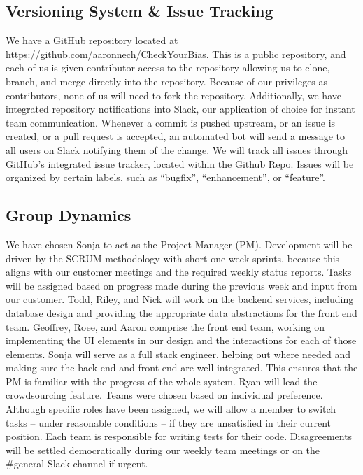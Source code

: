 \documentclass[11pt]{article}
\begin{document}
\subsection{Versioning System \& Issue Tracking}

We have a GitHub repository located at \href{https://github.com/aaronnech/CheckYourBias}{https://github.com/aaronnech/CheckYourBias}. This is a public repository, and each of us is given contributor access to the repository allowing us to clone, branch, and merge directly into the repository. Because of our privileges as contributors, none of us will need to fork the repository. Additionally, we have integrated repository notifications into Slack, our application of choice for instant team communication. Whenever a commit is pushed upstream, or an issue is created, or a pull request is accepted, an automated bot will send a message to all users on Slack notifying them of the change. We will track all issues through GitHub’s integrated issue tracker, located within the Github Repo. Issues will be organized by certain labels, such as ``bugfix'', ``enhancement'', or ``feature''. 

\subsection{Group Dynamics}

We have chosen Sonja to act as the Project Manager (PM). Development will be driven by the SCRUM methodology with short one-week sprints, because this aligns with our customer meetings and the required weekly status reports. Tasks will be assigned based on progress made during the previous week and input from our customer. Todd, Riley, and Nick will work on the backend services, including database design and providing the appropriate data abstractions for the front end team. Geoffrey, Roee, and Aaron comprise the front end team, working on implementing the UI elements in our design and the interactions for each of those elements. Sonja will serve as a full stack engineer, helping out where needed and making sure the back end and front end are well integrated. This ensures that the PM is familiar with the progress of the whole system. Ryan will lead the crowdsourcing feature. Teams were chosen based on individual preference. Although specific roles have been assigned, we will allow a member to switch tasks -- under reasonable conditions -- if they are unsatisfied in their current position. Each team is responsible for writing tests for their code. Disagreements will be settled democratically during our weekly team meetings or on the \#general Slack channel if urgent.
\end{document}

